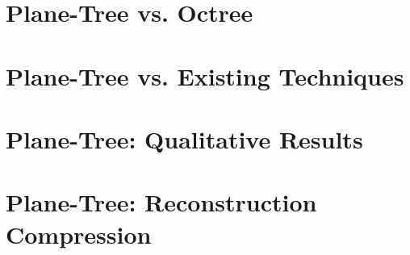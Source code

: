 \section{Plane-Tree vs. Octree}
\label{SEC:PTVSOT}

\section{Plane-Tree vs. Existing Techniques}
\label{SEC:PTVSSOTA}

\section{Plane-Tree: Qualitative Results}
\label{SEC:PTQUALEVAL}

\section{Plane-Tree: Reconstruction Compression}
\label{SEC:PTONRECON}




